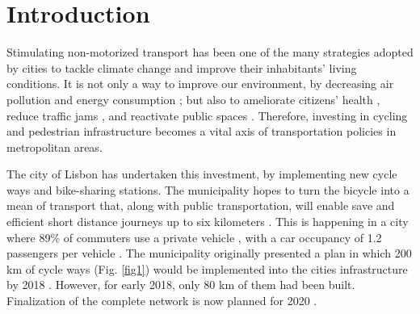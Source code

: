 \documentclass[information,article,submit,moreauthors,pdftex,10pt,a4paper]{mdpi}
\theoremstyle{mdpi}
\newcounter{ex}
\newcounter{re}
\theoremstyle{mdpidefinition}
\begin{document}


\section{Introduction}

Stimulating non-motorized transport has been one of the many strategies adopted by cities to tackle climate change \cite{Banister2011} and improve their inhabitants' living conditions. It is not only a way to improve our environment, by decreasing air pollution and energy consumption \cite{Fraser2011}; but also to ameliorate citizens' health \cite{DeHartog2010}, reduce traffic jams \cite{Kosha2016}, and reactivate public spaces \cite{DeManuelJerez2016}. Therefore, investing in cycling and pedestrian infrastructure becomes a vital axis of transportation policies in metropolitan areas.

The city of Lisbon has undertaken this investment, by implementing new cycle ways and bike-sharing stations. The municipality hopes to turn the bicycle into a mean of transport that, along with public transportation, will enable save and efficient short distance journeys up to six kilometers \cite{CamaraMunicipaldeLisboa}. This is happening in a city where 89\% of commuters use a private vehicle \cite{CamaraMunicipaldeLisboa2016}, with a car occupancy of 1.2 passengers per vehicle \cite{Silva2017}. The municipality originally presented a plan in which 200 km of cycle ways (Fig. \ref{fig1}) would be implemented into the cities infrastructure by 2018 \cite{Susete2016}. However, for early 2018, only 80 km of them had been built. Finalization of the complete network is now planned for 2020 \cite{Andre2018}.
\end{document}
